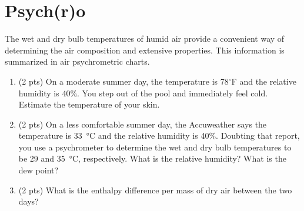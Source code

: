 \documentclass[11pt]{article}
\begin{document}
\section{Psych(r)o}
\label{sec-5}
The wet and dry bulb temperatures of humid air provide a convenient way of determining the air composition and extensive properties.  This information is summarized in air psychrometric charts.
\begin{enumerate}
\item (2 pts) On a moderate summer day, the temperature is 78\(^{\circ}\)F and the relative humidity is 40\%. You step out of the pool and immediately feel cold.  Estimate the temperature of your skin.
\item (2 pts) On a less comfortable summer day, the Accuweather says the temperature is \SI{33}{\celsius} and the relative humidity is 40\%. Doubting that report, you use a psychrometer to determine the wet and dry bulb temperatures to be 29 and \SI{35}{\celsius}, respectively.  What is the relative humidity?  What is the dew point?
\item (2 pts) What is the enthalpy difference per mass of dry air between the two days?
\end{enumerate}
\end{document}
